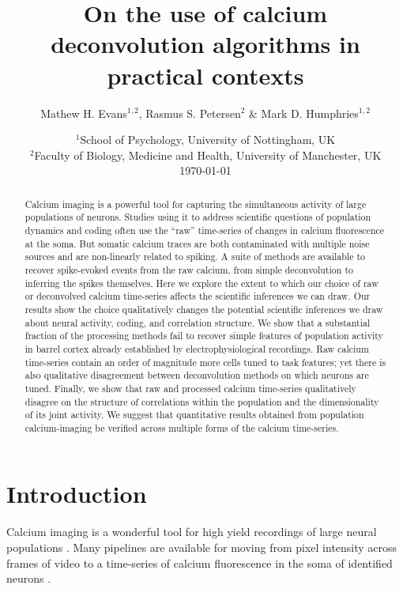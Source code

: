 \documentclass[a4paper,11pt]{article}
\title{\textbf{On the use of calcium deconvolution algorithms in practical contexts}}
\author{Mathew H. Evans$^{1,2}$, Rasmus S. Petersen$^2$ \& Mark D. Humphries$^{1,2}$}
\date{%
    $^1$School of Psychology, University of Nottingham, UK\\%
    $^2$Faculty of Biology, Medicine and Health, University of Manchester, UK\\[2ex]%
    \today
}
\begin{document}
\maketitle

\linenumbers
\begin{abstract}
Calcium imaging is a powerful tool for capturing the simultaneous activity of large populations of neurons. Studies using it to address scientific questions of population dynamics and coding often use the “raw” time-series of changes in calcium fluorescence at the soma. But somatic calcium traces are both contaminated with multiple noise sources and are non-linearly related to spiking. A suite of methods are available to recover spike-evoked events from the raw calcium, from simple deconvolution to inferring the spikes themselves. Here we explore the extent to which our choice of raw or deconvolved calcium time-series affects the scientific inferences we can draw. Our results show the choice qualitatively changes the potential scientific inferences we draw about neural activity, coding, and correlation structure. We show that a substantial fraction of the processing methods fail to recover simple features of population activity in barrel cortex already established by electrophysiological recordings. Raw calcium time-series contain an order of magnitude more cells tuned to task features; yet there is also qualitative disagreement between deconvolution methods on which neurons are tuned. Finally, we show that raw and processed calcium time-series qualitatively disagree on the structure of correlations within the population and the dimensionality of its joint activity. We suggest that quantitative results obtained from population calcium-imaging be verified across multiple forms of the calcium time-series. 
\end{abstract}


\section{Introduction}
Calcium imaging is a wonderful tool for high yield recordings of large neural populations \citep{Harris2016-zo, Stringer2019-ze,  Ahrens2013-wm, Portugues2014-kq}. Many pipelines are available for moving from pixel intensity across frames of video to a time-series of calcium fluorescence in the soma of identified neurons \citep{Mukamel2009-am, Vogelstein2010-uc, Kaifosh2014-zo, Pachitariu2016-ui, Deneux2016-gu, Pnevmatikakis2016-tk, Friedrich2017-ym, Keemink2018-li, Giovannucci2019-nj}.
\end{document}
